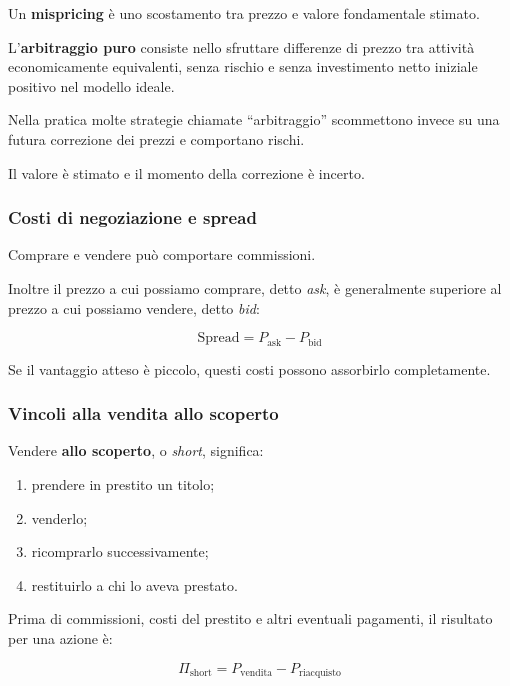 \noindent Un \textbf{mispricing}
è uno scostamento tra prezzo
e valore fondamentale stimato.

\noindent L'\textbf{arbitraggio puro}
consiste nello sfruttare differenze di prezzo
tra attività economicamente equivalenti,
senza rischio e senza investimento netto
iniziale positivo nel modello ideale.

\medskip

\noindent Nella pratica molte strategie
chiamate ``arbitraggio''
scommettono invece su una futura
correzione dei prezzi
e comportano rischi.

\noindent Il valore è stimato
e il momento della correzione è incerto.


\subsubsection*{Costi di negoziazione e spread}

\noindent Comprare e vendere
può comportare commissioni.

\noindent Inoltre il prezzo
a cui possiamo comprare,
detto \textit{ask},
è generalmente superiore
al prezzo a cui possiamo vendere,
detto \textit{bid}:

\[
\boxed{
\text{Spread}
=
P_{\mathrm{ask}}-P_{\mathrm{bid}}
}
\]

\noindent Se il vantaggio atteso è piccolo,
questi costi possono assorbirlo completamente.


\subsubsection*{Vincoli alla vendita allo scoperto}

\noindent Vendere \textbf{allo scoperto},
o \textit{short}, significa:

\begin{enumerate}
    \item prendere in prestito un titolo;
    \item venderlo;
    \item ricomprarlo successivamente;
    \item restituirlo a chi lo aveva prestato.
\end{enumerate}

\noindent Prima di commissioni,
costi del prestito e altri eventuali pagamenti,
il risultato per una azione è:

\[
\boxed{
\Pi_{\mathrm{short}}
=
P_{\mathrm{vendita}}
-
P_{\mathrm{riacquisto}}
}
\]

